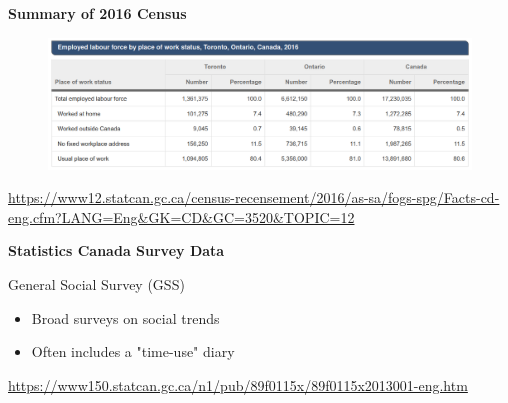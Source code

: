 \documentclass[aspectratio=169]{beamer}
\begin{document}
\begin{frame}
	
	\textbf{Summary of 2016 Census}
	
	\begin{figure}
		\centering
		\includegraphics[width=1\linewidth]{images/tor_emp_2016.png}
	\end{figure}
	
	\tiny\url{https://www12.statcan.gc.ca/census-recensement/2016/as-sa/fogs-spg/Facts-cd-eng.cfm?LANG=Eng\&GK=CD\&GC=3520\&TOPIC=12}
	
	
\end{frame}




\begin{frame}
	
	\textbf{Statistics Canada Survey Data}
	
	\vspace{2mm}
	
	General Social Survey (GSS)
	
	\begin{itemize}
		\item Broad surveys on social trends
		\item Often includes a "time-use" diary
	\end{itemize}

	\tiny\url{https://www150.statcan.gc.ca/n1/pub/89f0115x/89f0115x2013001-eng.htm}
	
	
\end{frame}
\end{document}
